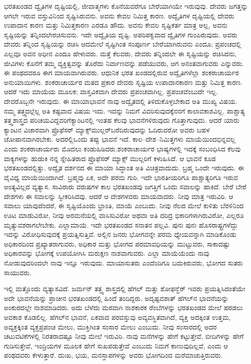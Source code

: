 ಭರತಖಂಡದ ದ್ವೈತಿಗಳ ದೃಷ್ಟಿಯಲ್ಲಿ, ಜೀವಾತ್ಮಗಳು ಕೊನೆಯವರೆಗೂ ಬೇರೆಯಾಗಿಯೇ ಇರುವುವು. ದೇವರು ಜಗತ್ತನ್ನು ಆಗಲೇ ಇರುವ ವಸ್ತು\-ವಿನಿಂದ ಸೃಷ್ಟಿಸಿರುವನು. ಅವನು ಕೇವಲ ನಿಮಿತ್ತ ಕಾರಣ. ಅದ್ವೈತಿಗಳ ದೃಷ್ಟಿಯಲ್ಲಿ ದೇವರು ಉಪಾದಾನ ಕಾರಣ ಮತ್ತು ನಿಮಿತ್ತಕಾರಣ ಎರಡೂ ಹೌದು. ಅವನು ಕೇವಲ ಸೃಷ್ಟಿಕರ್ತ ಮಾತ್ರ ಅಲ್ಲ, ಅವನು ಸೃಷ್ಟಿಯನ್ನು ತನ್ನಿಂದಲೇ\break ರಚಿಸುವನು. ಇದೇ ಅದ್ವೈತಿಯ ದೃಷ್ಟಿ. ಅಪರಿಪಕ್ವವಾದ ದ್ವೈತಿಗಳ ಗುಂಪಿರು\-ವುದು. ಅವರು ದೇವರು ತನ್ನಿಂದ ಸೃಷ್ಟಿಯನ್ನು ರಚಿಸಿ ಆದಮೇಲೆ ಸೃಷ್ಟಿಗಿಂತ ಸಂಪೂರ್ಣ ಬೇರೆಯಾಗಿರುವನು ಎಂದೂ; ಪ್ರಪಂಚದಲ್ಲಿ ಎಲ್ಲವೂ ಅವನ ಅಧೀನ ಎಂದೂ ಹೇಳುವರು. ಮತ್ತೆ ಕೆಲವರು, ದೇವರು ತನ್ನಿಂದಲೇ ಈ ಸೃಷ್ಟಿಯನ್ನು ರಚಿಸಿದನು, ಜೀವಿಗಳು ಕೊನೆಗೆ ತಮ್ಮ ವ್ಯಕ್ತಿತ್ವವನ್ನು ತೊರೆದು ನಿರ್ವಾಣವನ್ನು ಪಡೆಯುವರು, ಆಗ ಅನಂತವಾಗುವರು ಎನ್ನುವರು. ಈ ಪಂಥದವರೂ ಈಗ ಮಾಯವಾಗಿರುವರು. ಆಧುನಿಕ ಭರತ ಖಂಡದಲ್ಲಿರುವ ಅದ್ವೈತಿಗಳೆಲ್ಲಾ ಶಂಕರಾಚಾರ್ಯರ ಅನುಯಾಯಿಗಳು. ಶಂಕರಾಚಾರ್ಯರ ಮತದ ಪ್ರಕಾರ ದೇವರು ಸೃಷ್ಟಿಯ ಉಪಾದಾನಕಾರಣ ಮತ್ತು ನಿಮಿತ್ತ ಕಾರಣ. ಆದರೆ ಇದು ಮಾಯೆಯ ಮೂಲಕ; ವಾಸ್ತವಿಕವಾಗಿ ದೇವರು ಪ್ರಪಂಚವಾಗಿಲ್ಲ. ಪ್ರಪಂಚವೆಂಬುದೇ ಇಲ್ಲ. ದೇವರೊಬ್ಬನೇ ಇರುವುದು. ಈ ಮಾಯಾ\-ಭಾವನೆ ನಾವು ಅದ್ವೈತದಲ್ಲಿ ತಿಳಿದುಕೊಳ್ಳಬೇಕಾದ ಅತಿ ಮುಖ್ಯ ವಿಷಯ. ನಮ್ಮ ತತ್ತ್ವದಲ್ಲೆಲ್ಲ ಅತಿ ಕಷ್ಟವಾದ ವಿಷಯ ಇದು. ಇದನ್ನು ನಿಮಗೆ ವಿವರಿಸುವುದಕ್ಕೆ\break ನನಗೆ ಕಾಲಾವಕಾಶವಿಲ್ಲ. ಪಾಶ್ಚಾತ್ಯ ತತ್ತ್ವಶಾಸ್ತ್ರದ ಪರಿಚಯವಿದ್ದವರಿಗೆ\break ಕ್ಯಾಂಟನಲ್ಲಿ ಇಂತಹ ಕೆಲವು ಭಾವನೆಗಳಿರುವುದು ಗೊತ್ತಾಗುವುದು. ಆದರೆ ಯಾರು ಕ್ಯಾಂಟನ ವಿಚಾರವಾಗಿ ಪ್ರೊಫೆಸರ್​ ಮ್ಯಾಕ್ಸ್‌ಮುಲ್ಲರ್​ ಬರೆದಿರುವು\-ದನ್ನು ಓದಿರುವರೋ ಅವರು ಬಹಳ ಜೋಪಾನವಾಗಿರಬೇಕು. ಅದರಲ್ಲಿ\break ಒಂದು ತಪ್ಪು ಭಾವನೆ ಇದೆ. ಕಾಲ–ದೇಶ–ನಿಮಿತ್ತಗಳು ಮಾಯೆಯಿಂದ\break ಭಿನ್ನವಲ್ಲ ಎಂದು ಶಂಕರಾಚಾರ್ಯರು ಮೊದಲು ಕಂಡುಹಿಡಿದರು.\break ಶಂಕರಾಚಾರ್ಯರ ಭಾಷ್ಯಗಳಲ್ಲಿ ಇದಕ್ಕೆ ಸಂಬಂಧಿಸಿದ ಕೆಲವು ವಾಕ್ಯಗಳನ್ನು ಹುಡುಕಿ ನನ್ನ ಸ್ನೇಹಿತರಾದ ಪ್ರೊಫೆಸರ್​ ಮ್ಯಾಕ್ಸ್ ಮುಲ್ಲರಿಗೆ ಕಳುಹಿಸಿದೆ. ಆ ಭಾವನೆ ಕೂಡ ಭರತಖಂಡದಲ್ಲಿತ್ತು. ಅದ್ವೈತ ದರ್ಶನದ ಈ ಮಾಯಾ ಸಿದ್ಧಾಂತ ಅತಿ ವಿಚಿತ್ರವಾದುದು. ಬ್ರಹ್ಮ ಒಂದೇ ಇರುವುದು. ಈ ವೈವಿಧ್ಯ ಮಾಯೆಯಿಂದಾಗಿದೆ. ಬ್ರಹ್ಮವು ಏಕ, ಅದೇ ಪರಮ ಗುರಿ. ಇದೇ ಭಾರತೀಯರಿಗೂ ಪಾಶ್ಚಾತ್ಯರಿಗೂ ಇರುವ ಅಂತ್ಯವಿಲ್ಲದ ವ್ಯತ್ಯಾಸ. ಸಾವಿರಾರು ವರುಷಗಳ ಕಾಲ ಭರತಖಂಡವು ಜಗತ್ತಿಗೆ ಒಂದು ಸವಾಲನ್ನು ಹಾಕಿದೆ. ಬೇರೆ ಬೇರೆ ದೇಶಗಳು ಈ ಸವಾಲನ್ನು ಸ್ವೀಕರಿಸಿದವು. ಆದರೆ ಆ ದೇಶಗಳವರು ಮಾಯವಾದರು. ನೀವು ಮಾತ್ರ ಇರುವಿರಿ. ಆ ಸವಾಲು ಯಾವುದೆಂದರೆ, ಈ ಸೃಷ್ಟಿಯೊಂದು ಭ್ರಾಂತಿ, ಮಾಯೆ ಎಂಬುದು. ನೀವು ನೆಲದ ಮೇಲೆ ಕುಳಿತು ಬೆರಳಿನಿಂದ ಊಟ ಮಾಡುವಿರೋ, ನೀವು ಅರಮನೆಯಲ್ಲಿ ವಾಸಿಸುವಿರೋ ಅಥವಾ ಅತಿ ದರಿದ್ರ ಭಿಕಾರಿಗಳಾಗಿರುವಿರೋ, ಎಲ್ಲರೂ ಮೃತ್ಯುವಶರಾಗಲೇಬೇಕು. ಎಲ್ಲಾ\break ಮಾಯೆ. ಇದೇ ಭರತಖಂಡದ ಸನಾತನ ಪಲ್ಲವಿ. ಪುನಃ ಪುನಃ ಹೊಸ\break ರಾಷ್ಟ್ರಗಳೆದ್ದು ಇದನ್ನು ವಿರೋಧಿಸುವುದಕ್ಕೆ ಪ್ರಯತ್ನಿಸುತ್ತಿವೆ. ಅಲ್ಲಿನ ಜನರು ಭೋಗವನ್ನೇ ಪರಮ ಧ್ಯೇಯವನ್ನಾಗಿ ಮಾಡಿಕೊಂಡು ಅಧಿಕಾರದಿಂದ ಪ್ರಖ್ಯಾತರಾಗುವರು, ಅಧಿಕಾರ ಮತ್ತು ಭೋಗದ ಪರಮಾವಧಿಯನ್ನು ಮುಟ್ಟುವರು, ಸಾಕಾದಷ್ಟು ಅಧಿಕಾರವನ್ನು ಭೋಗಕ್ಕೆ ಉಪಯೋಗಿಸಿ ಮರುಕ್ಷಣ ನಾಶವಾಗುವರು. ಎಲ್ಲಾ ಮಾಯೆಯೆಂದು ನಾವು ನೋಡುವುದರಿಂದಲೇ ನಾವು ಇನ್ನೂ ಇರುವುದು. ಮಾಯಾಸುತರು ಎಂದೆಂದಿಗೂ ಬದುಕಿರುವರು, ಭೋಗದ ಸುತರು ಸಾಯುವರು.

\newpage

ಇಲ್ಲಿ ಮತ್ತೊಂದು ವ್ಯತ್ಯಾಸವಿದೆ. ಜರ್ಮನ್​ ತತ್ತ್ವ ಶಾಸ್ತ್ರದಲ್ಲಿ ಹೆಗಲ್​ ಮತ್ತು ಶೋಫನ್ಹೆರ್​ ಇವರು ಪ್ರಯತ್ನಿಸಿದಂತೆಯೇ ಅದೇ ಭಾವನೆಯನ್ನು ಪ್ರಾಚೀನ ಭರತಖಂಡದಲ್ಲಿ ಹಿಂದೆ ತಂದಿದ್ದರು. ಅದೃಷ್ಟವಶಾತ್​ ಹೆಗಲ್​ನ ಭಾವನೆಯನ್ನು ಅಂಕುರದಲ್ಲೇ ನಾಶಮಾಡಿದರು. ಅದು ಬೆಳೆದು ಮರವಾಗಿ ನಾಶಕಾರಕ ರೆಂಬೆಗಳನ್ನು ಭರತಖಂಡದ ಮೇಲೆ ಹರಡಲು ಅವಕಾಶ ಕೊಡಲಿಲ್ಲ. ಹೆಗಲ್​ನ ಭಾವನೆ, ಏಕವಾದ ಪರವಸ್ತುವು ಅವ್ಯವಸ್ಥಿತವಾಗಿದೆ, ವ್ಯಕ್ತಿ ಅದಕ್ಕಿಂತ ಉತ್ತಮ, ಅವ್ಯಕ್ತಕ್ಕಿಂತ ವ್ಯಕ್ತಪ್ರಪಂಚ ಮೇಲು, ಮುಕ್ತಿಗಿಂತ ಸಂಸಾರ ಮೇಲು ಎಂಬುದು. ನೀವು ಸಂಸಾರದಲ್ಲಿ ಅದರ ಚಟುವಟಿಕೆಗಳಲ್ಲಿ ನಿರತರಾದಷ್ಟೂ ನೀವು ಮೇಲೆ ಇರುವಿರಿ. ನಾವು ಮನೆಗಳನ್ನು ಹೇಗೆ ಕಟ್ಟುತ್ತೇವೆ, ಬೀದಿಗಳನ್ನು ಹೇಗೆ ಗುಡಿಸುತ್ತೇವೆ, ಇಂದ್ರಿಯಗಳ ಮೂಲಕ ಹೇಗೆ ಸುಖಪಡುತ್ತೇವೆ ಎಂಬುದು ನಿಮಗೆ ಕಾಣುವುದಿಲ್ಲವೆ, ಎಂದು ಆ ಪಂಥದವರು ಕೇಳುತ್ತಾರೆ. ದುಃಖ, ಭಯ, ಮನಸ್ತಾಪಗಳನ್ನು ಅವರು ಭೋಗದಿಂದ ಮರೆಮಾಚುತ್ತಿರುವರು.

